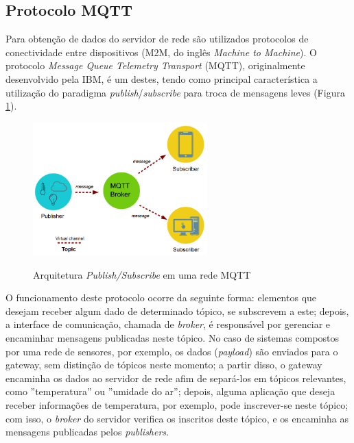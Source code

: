 \documentclass[oneside,openright,12pt]{ufsm_2015} %
\begin{document}
\subsection{Protocolo MQTT}
Para obtenção de dados do servidor de rede são utilizados protocolos de conectividade entre dispositivos (M2M, do inglês \textit{Machine to Machine}). O protocolo \textit{Message Queue Telemetry Transport} (MQTT), originalmente desenvolvido pela IBM, é um destes, tendo como principal característica a utilização do paradigma \textit{publish}/\textit{subscribe} para troca de mensagens leves (Figura \ref{fig:mqtt-topico}).
\begin{figure}[H]
    \caption{\label{exepretex} Arquitetura \textit{Publish/Subscribe} em uma rede MQTT} 
    \centering
    \includegraphics[width=0.6\textwidth]{figuras/publish-subscribe.png}
    \vspace{\baselineskip} %
        \label{fig:mqtt-topico}
\end{figure}

O funcionamento deste protocolo ocorre da seguinte forma: elementos que desejam receber algum dado de determinado tópico, se subscrevem a este; depois, a interface de comunicação, chamada de \textit{broker}, é responsável por gerenciar e encaminhar mensagens publicadas neste tópico. No caso de sistemas compostos por uma rede de sensores, por exemplo, os dados (\textit{payload}) são enviados para o gateway, sem distinção de tópicos neste momento; a partir disso, o gateway encaminha os dados ao servidor de rede afim de separá-los em tópicos relevantes, como ''temperatura'' ou ''umidade do ar''; depois, alguma aplicação que deseja receber informações de temperatura, por exemplo, pode inscrever-se neste tópico; com isso, o \textit{broker} do servidor verifica os inscritos deste tópico, e os encaminha as mensagens publicadas pelos \textit{publishers}. 
\end{document}
